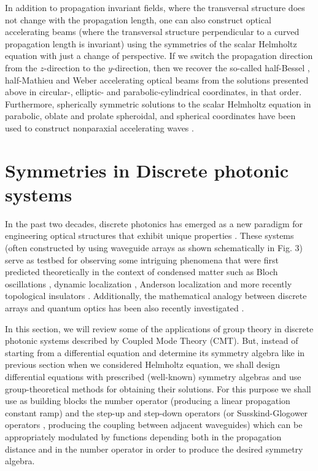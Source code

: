 \documentclass[12pt]{iopart}
\begin{document}
In addition to propagation invariant fields, where the transversal structure does not change with the propagation length, one can also construct optical accelerating beams (where the transversal structure perpendicular to a curved propagation length is invariant) using the symmetries of the scalar Helmholtz equation with just a change of perspective. If we switch the propagation direction from the $z$-direction to the $y$-direction, then we recover the so-called half-Bessel \cite{Kaminer2012p163901,Mathis2013p2218},  half-Mathieu \cite{Zhang2012p193901} and Weber \cite{Bandres2013p013054} accelerating optical beams from the solutions presented above in circular-, elliptic- and parabolic-cylindrical coordinates, in that order.
Furthermore, spherically symmetric solutions to the scalar Helmholtz equation in parabolic, oblate and prolate spheroidal, and spherical coordinates have been used to construct nonparaxial accelerating waves  \cite{Alonso2012p5175,Bandres2013p30}.



\section{Symmetries in Discrete photonic systems}

In the past two decades, discrete photonics has emerged as a new paradigm for engineering optical structures that exhibit unique properties \cite{Discrete_review}. These systems (often constructed by using waveguide arrays as shown schematically in Fig. 3)  serve as testbed for observing some intriguing phenomena that were first predicted theoretically in the context of condensed matter such as Bloch oscillations \cite{Bessel,Bloch1,Bloch2,Bloch3}, dynamic localization \cite{DL1,DL2}, Anderson localization \cite{AL}  and more recently topological insulators \cite{Topo1,Topo2,Topo3, Topo4}. Additionally, the mathematical analogy between discrete arrays and quantum optics has been also recently investigated \cite{Hector-Christodoulides-Blas,BlasErmakov}.

In this section, we will review some of the applications of group theory in discrete photonic systems described by Coupled Mode Theory (CMT).
But, instead of starting from a differential equation and determine its symmetry
algebra like in previous section when we considered Helmholtz equation, we shall design  differential equations with prescribed (well-known) symmetry algebras and use
group-theoretical methods for obtaining their solutions. For this purpose we shall use as building blocks the number operator (producing a linear propagation constant ramp)
and the step-up and step-down operators (or Susskind-Glogower operators \cite{SG}, producing the coupling between adjacent waveguides) which can be appropriately modulated by functions depending both
in the propagation distance and in the number operator in order to produce the desired symmetry algebra.
\end{document}
